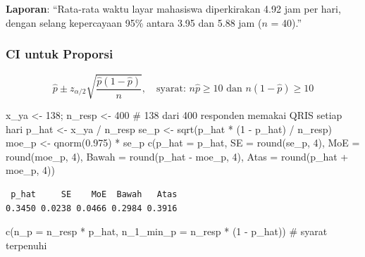 \documentclass[
  indonesian,
  letterpaper,
]{book}
\newenvironment{Shaded}{\begin{snugshade}}{\end{snugshade}}
\newcommand{\AttributeTok}[1]{\textcolor[rgb]{0.40,0.45,0.13}{#1}}
\newcommand{\CommentTok}[1]{\textcolor[rgb]{0.37,0.37,0.37}{#1}}
\newcommand{\DecValTok}[1]{\textcolor[rgb]{0.68,0.00,0.00}{#1}}
\newcommand{\FloatTok}[1]{\textcolor[rgb]{0.68,0.00,0.00}{#1}}
\newcommand{\FunctionTok}[1]{\textcolor[rgb]{0.28,0.35,0.67}{#1}}
\newcommand{\NormalTok}[1]{\textcolor[rgb]{0.00,0.23,0.31}{#1}}
\newcommand{\OtherTok}[1]{\textcolor[rgb]{0.00,0.23,0.31}{#1}}
\newcommand{\SpecialCharTok}[1]{\textcolor[rgb]{0.37,0.37,0.37}{#1}}
\begin{document}
\textbf{Laporan}: ``Rata-rata waktu layar mahasiswa diperkirakan 4.92
jam per hari, dengan selang kepercayaan 95\% antara 3.95 dan 5.88 jam
(\(n\) = 40).''

\subsubsection{CI untuk Proporsi}\label{ci-untuk-proporsi}

\[\hat{p} \pm z_{\alpha/2} \sqrt{\frac{\hat{p}(1-\hat{p})}{n}}, \quad \text{syarat: } n\hat{p} \geq 10 \text{ dan } n(1-\hat{p}) \geq 10\]

\begin{Shaded}
\begin{Highlighting}[]
\NormalTok{x\_ya }\OtherTok{\textless{}{-}} \DecValTok{138}\NormalTok{; n\_resp }\OtherTok{\textless{}{-}} \DecValTok{400} \CommentTok{\# 138 dari 400 responden memakai QRIS setiap hari}
\NormalTok{p\_hat }\OtherTok{\textless{}{-}}\NormalTok{ x\_ya }\SpecialCharTok{/}\NormalTok{ n\_resp}
\NormalTok{se\_p }\OtherTok{\textless{}{-}} \FunctionTok{sqrt}\NormalTok{(p\_hat }\SpecialCharTok{*}\NormalTok{ (}\DecValTok{1} \SpecialCharTok{{-}}\NormalTok{ p\_hat) }\SpecialCharTok{/}\NormalTok{ n\_resp)}
\NormalTok{moe\_p }\OtherTok{\textless{}{-}} \FunctionTok{qnorm}\NormalTok{(}\FloatTok{0.975}\NormalTok{) }\SpecialCharTok{*}\NormalTok{ se\_p}
\FunctionTok{c}\NormalTok{(}\AttributeTok{p\_hat =}\NormalTok{ p\_hat, }\AttributeTok{SE =} \FunctionTok{round}\NormalTok{(se\_p, }\DecValTok{4}\NormalTok{), }\AttributeTok{MoE =} \FunctionTok{round}\NormalTok{(moe\_p, }\DecValTok{4}\NormalTok{),}
\AttributeTok{Bawah =} \FunctionTok{round}\NormalTok{(p\_hat }\SpecialCharTok{{-}}\NormalTok{ moe\_p, }\DecValTok{4}\NormalTok{), }\AttributeTok{Atas =} \FunctionTok{round}\NormalTok{(p\_hat }\SpecialCharTok{+}\NormalTok{ moe\_p, }\DecValTok{4}\NormalTok{))}
\end{Highlighting}
\end{Shaded}

\begin{verbatim}
 p_hat     SE    MoE  Bawah   Atas 
0.3450 0.0238 0.0466 0.2984 0.3916 
\end{verbatim}

\begin{Shaded}
\begin{Highlighting}[]
\FunctionTok{c}\NormalTok{(}\AttributeTok{n\_p =}\NormalTok{ n\_resp }\SpecialCharTok{*}\NormalTok{ p\_hat, }\AttributeTok{n\_1\_min\_p =}\NormalTok{ n\_resp }\SpecialCharTok{*}\NormalTok{ (}\DecValTok{1} \SpecialCharTok{{-}}\NormalTok{ p\_hat)) }\CommentTok{\# syarat terpenuhi}
\end{Highlighting}
\end{Shaded}
\end{document}
